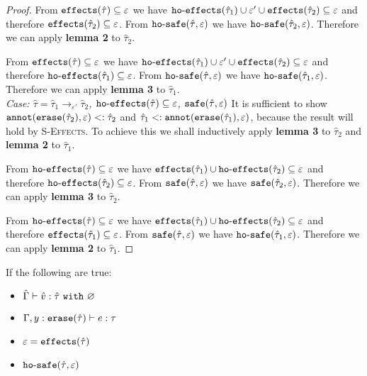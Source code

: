 \begin{appendix}
\begin{proof}
From $\mathtt{effects}(\hat \tau) \subseteq \varepsilon$ we have $\mathtt{ho \hbox{-} effects}(\hat \tau_1) \cup \varepsilon' \cup \mathtt{effects}(\hat \tau_2) \subseteq \varepsilon$ and therefore $\mathtt{effects}(\hat \tau_2) \subseteq \varepsilon$. From $\mathtt{ho \hbox{-} safe}(\hat \tau, \varepsilon)$ we have $\mathtt{ho \hbox{-} safe}(\hat \tau_2, \varepsilon)$. Therefore we can apply \textbf{lemma 2} to $\hat \tau_2$.

From $\mathtt{effects}(\hat \tau) \subseteq \varepsilon$ we have $\mathtt{ho \hbox{-} effects}(\hat \tau_1) \cup \varepsilon' \cup \mathtt{effects}(\hat \tau_2) \subseteq \varepsilon$ and therefore $\mathtt{ho \hbox{-} effects}(\hat \tau_1) \subseteq \varepsilon$. From $\mathtt{ho \hbox{-} safe}(\hat \tau, \varepsilon)$ we have $\mathtt{ho \hbox{-} safe}(\hat \tau_1, \varepsilon)$. Therefore we can apply \textbf{lemma 3} to $\hat \tau_1$.\\

\textit{Case: $\hat \tau = \hat \tau_1 \rightarrow_{\varepsilon'} \hat \tau_2$, $\mathtt{ho \hbox{-} effects}(\hat \tau) \subseteq \varepsilon$, $\mathtt{safe}(\hat \tau, \varepsilon)$ } It is sufficient to show $\mathtt{annot(erase}(\hat \tau_2), \varepsilon) <: \hat \tau_2$ and $\hat \tau_1 <: \mathtt{annot(erase}(\hat \tau_1), \varepsilon)$, because the result will hold by \textsc{S-Effects}. To achieve this we shall inductively apply \textbf{lemma 3} to $\hat \tau_2$ and \textbf{lemma 2} to $\hat \tau_1$.

From $\mathtt{ho \hbox{-} effects}(\hat \tau) \subseteq \varepsilon$ we have $\mathtt{effects}(\hat \tau_1) \cup \mathtt{ho \hbox{-} effects}(\hat \tau_2) \subseteq \varepsilon$ and therefore $\mathtt{ho \hbox{-} effects}(\hat \tau_2) \subseteq \varepsilon$. From $\mathtt{safe}(\hat \tau, \varepsilon)$ we have $\mathtt{safe}(\hat \tau_2, \varepsilon)$. Therefore we can apply \textbf{lemma 3} to $\hat \tau_2$.

From $\mathtt{ho \hbox{-} effects}(\hat \tau) \subseteq \varepsilon$ we have $\mathtt{effects}(\hat \tau_1) \cup \mathtt{ho \hbox{-} effects}(\hat \tau_2) \subseteq \varepsilon$ and therefore $\mathtt{effects}(\hat \tau_1) \subseteq \varepsilon$. From $\mathtt{safe}(\hat \tau, \varepsilon)$ we have $\mathtt{ho \hbox{-} safe}(\hat \tau_1, \varepsilon)$. Therefore we can apply \textbf{lemma 2} to $\hat \tau_1$.

\end{proof}


\hrulefill

\begin{lemma}[Annotation]
If the following are true:

\begin{itemize}
	\setlength\itemsep{-0.7em}
	\item $\hat \Gamma \vdash \hat v : \hat \tau~\mathtt{with}~ \varnothing$
	\item $\Gamma, y: \mathtt{erase}(\hat \tau) \vdash e: \tau$
	\item $\varepsilon = \mathtt{effects}(\hat \tau)$
	\item $\mathtt{ho \hbox{-} safe}(\hat \tau, \varepsilon)$
\end{itemize}


\end{lemma}
\end{appendix}
